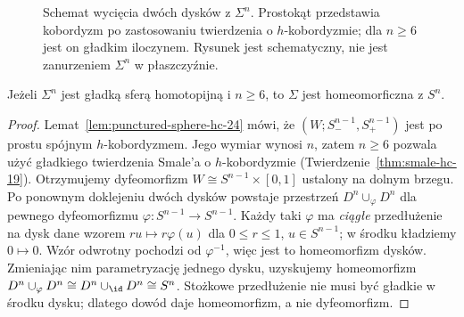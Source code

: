 \begin{figure}[htbp]
\centering
{}
\caption{Schemat wycięcia dwóch dysków z $\Sigma^n$.
Prostokąt przedstawia kobordyzm po zastosowaniu
twierdzenia o $h$-kobordyzmie; dla $n\geq6$
jest on gładkim iloczynem. Rysunek jest
schematyczny, nie jest zanurzeniem $\Sigma^n$
w płaszczyźnie.}
\label{fig:poincare-two-disks-24}
\end{figure}

\begin{twierdzenie}
\label{thm:poincare-high-24}
Jeżeli $\Sigma^n$ jest gładką sferą
homotopijną i $n\geq6$, to
$\Sigma$ jest homeomorficzna z $S^n$.
\end{twierdzenie}
\begin{proof}
Lemat~\ref{lem:punctured-sphere-hc-24}
mówi, że $(W;S_-^{n-1},S_+^{n-1})$
jest po prostu spójnym $h$-kobordyzmem.
Jego wymiar wynosi $n$, zatem $n\geq6$
pozwala użyć gładkiego twierdzenia
Smale'a o $h$-kobordyzmie
(Twierdzenie~\ref{thm:smale-hc-19}).
Otrzymujemy dyfeomorfizm
$W\cong S^{n-1}\times[0,1]$
ustalony na dolnym brzegu.
Po ponownym doklejeniu dwóch dysków
powstaje przestrzeń
$D^n\cup_{\varphi}D^n$
dla pewnego dyfeomorfizmu
$\varphi:S^{n-1}\to S^{n-1}$.
Każdy taki $\varphi$ ma \emph{ciągłe}
przedłużenie na dysk dane wzorem
$r u\mapsto r\varphi(u)$ dla
$0\leq r\leq1$, $u\in S^{n-1}$;
w środku kładziemy $0\mapsto0$.
Wzór odwrotny pochodzi od
$\varphi^{-1}$, więc jest to
homeomorfizm dysków. Zmieniając
nim parametryzację jednego dysku,
uzyskujemy homeomorfizm
$D^n\cup_\varphi D^n\cong
D^n\cup_{\id}D^n\cong S^n$.
Stożkowe przedłużenie nie musi
być gładkie w środku dysku;
dlatego dowód daje homeomorfizm,
a nie dyfeomorfizm.
\end{proof}


